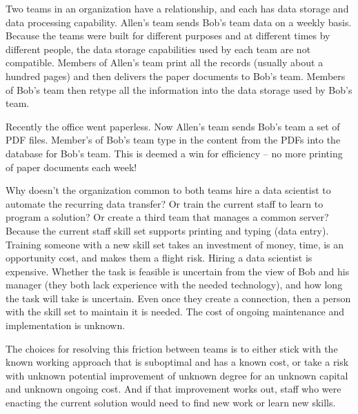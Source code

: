 \begin{mdframed}[frametitle={Data Transfer from one Team to Another},frametitlerule=true,frametitlealignment=\centering]
Two teams in an organization have a relationship, and each has data storage and data processing capability. Allen's team sends Bob's team data on a weekly basis. Because the teams were built for different purposes and at different times by different people, the data storage capabilities used by each team are not compatible. Members of Allen's team print all the records (usually about a hundred pages) and then delivers the paper documents to Bob's team. Members of Bob's team then retype all the information into the data storage used by Bob's team.

Recently the office went paperless. Now Allen's team sends Bob's team a set of PDF files. Member's of Bob's team type in the content from the PDFs into the database for Bob's team. This is deemed a win for efficiency -- no more printing of paper documents each week!

Why doesn't the organization common to both teams hire a data scientist to automate the recurring data transfer? Or train the current staff to learn to program a solution? Or create a third team that manages a common server?
Because the current staff skill set supports printing and typing (data entry). Training someone with a new skill set takes an investment of money, time, is an opportunity cost, and makes them a flight risk.
Hiring a data scientist is expensive. Whether the task is feasible is uncertain from the view of Bob and his manager (they both lack experience with the needed technology), and how long the task will take is uncertain. Even once they create a connection, then a person with the skill set to maintain it is needed. The cost of ongoing maintenance and implementation is unknown.

\end{mdframed}
The choices for resolving this friction between teams is to either stick with the known working approach that is suboptimal and has a known cost, or take a risk with unknown potential improvement of unknown degree for an unknown capital and unknown ongoing cost.
And if that improvement works out, staff who were enacting the current solution would need to find new work or learn new skills.
